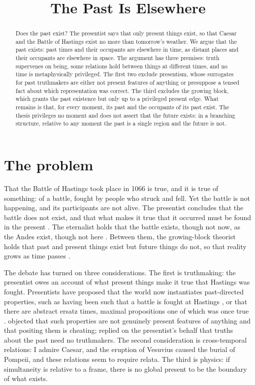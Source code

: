 \documentclass{situationist-preprint}
\title{The Past Is Elsewhere}
\begin{document}
\maketitle

\begin{abstract}
Does the past exist? The presentist says that only present things exist, so that Caesar and the Battle of Hastings exist no more than tomorrow's weather. We argue that the past exists: past times and their occupants are elsewhere in time, as distant places and their occupants are elsewhere in space. The argument has three premises: truth supervenes on being, some relations hold between things at different times, and no time is metaphysically privileged. The first two exclude presentism, whose surrogates for past truthmakers are either not present features of anything or presuppose a tensed fact about which representation was correct. The third excludes the growing block, which grants the past existence but only up to a privileged present edge. What remains is that, for every moment, its past and the occupants of its past exist. The thesis privileges no moment and does not assert that the future exists: in a branching structure, relative to any moment the past is a single region and the future is not.
\end{abstract}

\section{The problem}

That the Battle of Hastings took place in 1066 is true, and it is true of something: of a battle, fought by people who struck and fell. Yet the battle is not happening, and its participants are not alive. The presentist concludes that the battle does not exist, and that what makes it true that it occurred must be found in the present \citep{Prior1970,Markosian2004}. The eternalist holds that the battle exists, though not now, as the Andes exist, though not here \citep{Quine1960,Williams1951,Sider2001}. Between them, the growing-block theorist holds that past and present things exist but future things do not, so that reality grows as time passes \citep{Broad1923,Tooley1997}.

The debate has turned on three considerations. The first is truthmaking: the presentist owes an account of what present things make it true that Hastings was fought. Presentists have proposed that the world now instantiates past-directed properties, such as having been such that a battle is fought at Hastings \citep{Bigelow1996}, or that there are abstract ersatz times, maximal propositions one of which was once true \citep{Crisp2007}. \citet{Sider2001} objected that such properties are not genuinely present features of anything and that positing them is cheating; \citet{Merricks2007} replied on the presentist's behalf that truths about the past need no truthmakers. The second consideration is cross-temporal relations: I admire Caesar, and the eruption of Vesuvius caused the burial of Pompeii, and these relations seem to require relata. The third is physics: if simultaneity is relative to a frame, there is no global present to be the boundary of what exists.
\end{document}
